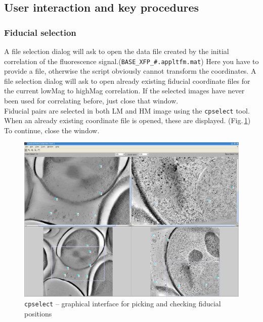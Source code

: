 \documentclass[10pt,a4paper,onepage,DIV12]{scrartcl}
\begin{document}
\subsection{User interaction and key procedures}
\subsubsection{Fiducial selection}
\label{sec:HM_fiducials}
A file selection dialog will ask to open the data file created by the initial correlation of the fluorescence signal.(\texttt{BASE\_XFP\_\#.appltfm.mat}) Here you have to provide a file, otherwise the script obviously cannot transform the coordinates.%
A file selection dialog will ask to open already existing fiducial coordinate files for the current lowMag to highMag correlation. If the selected images have never been used for correlating before, just close that window.\\

Fiducial pairs are selected in both LM and HM image using the \texttt{cpselect} tool. When an already existing coordinate file is opened, these are displayed. (Fig.\,\ref{fig:cpsel_HM}) To continue, close the window.
\begin{figure}
 \centering
 \includegraphics[width=.78\textwidth]{images/cpsel_HM.jpg}
 \caption{\texttt{cpselect} -- graphical interface for picking and checking fiducial positions}
 \label{fig:cpsel_HM}
\end{figure}
\end{document}
